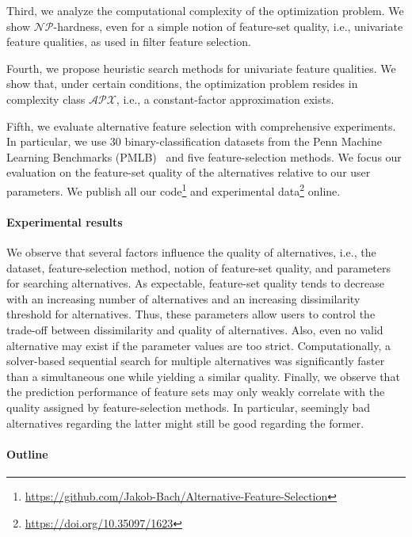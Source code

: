 \documentclass{article}
\theoremstyle{definition}
\begin{document}
Third, we analyze the computational complexity of the optimization problem.
We show $\mathcal{NP}$-hardness, even for a simple notion of feature-set quality, i.e., univariate feature qualities, as used in filter feature selection.

Fourth, we propose heuristic search methods for univariate feature qualities.
We show that, under certain conditions, the optimization problem resides in complexity class $\mathcal{APX}$, i.e., a constant-factor approximation exists.

Fifth, we evaluate alternative feature selection with comprehensive experiments.
In particular, we use 30 binary-classification datasets from the Penn Machine Learning Benchmarks (PMLB)~\cite{olson2017pmlb, romano2021pmlb} and five feature-selection methods.
We focus our evaluation on the feature-set quality of the alternatives relative to our user parameters.
We publish all our code\footnote{\url{https://github.com/Jakob-Bach/Alternative-Feature-Selection}} and experimental data\footnote{\url{https://doi.org/10.35097/1623}} online.

\paragraph{Experimental results}

We observe that several factors influence the quality of alternatives, i.e., the dataset, feature-selection method, notion of feature-set quality, and parameters for searching alternatives.
As expectable, feature-set quality tends to decrease with an increasing number of alternatives and an increasing dissimilarity threshold for alternatives.
Thus, these parameters allow users to control the trade-off between dissimilarity and quality of alternatives.
Also, even no valid alternative may exist if the parameter values are too strict.
Computationally, a solver-based sequential search for multiple alternatives was significantly faster than a simultaneous one while yielding a similar quality.
Finally, we observe that the prediction performance of feature sets may only weakly correlate with the quality assigned by feature-selection methods.
In particular, seemingly bad alternatives regarding the latter might still be good regarding the former.

\paragraph{Outline}
\end{document}

